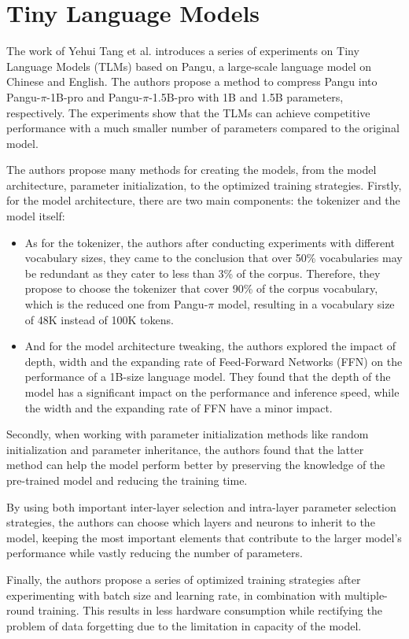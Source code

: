 \section{Tiny Language Models}
The work of Yehui Tang et al. \cite{tang2024rethinkingoptimizationarchitecturetiny} introduces a series of experiments on Tiny Language Models (TLMs) based on Pangu, a large-scale  language model on Chinese and English. The authors propose a method to compress Pangu into Pangu-$\pi$-1B-pro and Pangu-$\pi$-1.5B-pro with 1B and 1.5B parameters, respectively. The experiments show that the TLMs can achieve competitive performance with a much smaller number of parameters compared to the original model. \par
The authors propose many methods for creating the models, from the model architecture, parameter initialization, to the optimized training strategies. Firstly, for the model architecture, there are two main components: the tokenizer and the model itself:
\begin{itemize}
    \item As for the tokenizer, the authors after conducting experiments with different vocabulary sizes, they came to the conclusion that over 50\% vocabularies may be redundant as they cater to less than 3\% of the corpus. Therefore, they propose to choose the tokenizer that cover 90\% of the corpus vocabulary, which is the reduced one from Pangu-$\pi$ model, resulting in a vocabulary size of 48K instead of 100K tokens. 
    \item And for the model architecture tweaking, the authors explored the impact of depth, width and the expanding rate of Feed-Forward Networks (FFN) on the performance of a 1B-size language model. They found that the depth of the model has a significant impact on the performance and inference speed, while the width and the expanding rate of FFN have a minor impact.

\end{itemize}
Secondly, when working with parameter initialization methods like random initialization and parameter inheritance, the authors found that the latter method can help the model perform better by preserving the knowledge of the pre-trained model and reducing the training time. \par
By using both important inter-layer selection and intra-layer parameter selection strategies, the authors can choose which layers and neurons to inherit to the model, keeping the most important elements that contribute to the larger model's performance while vastly reducing the number of parameters. \par
Finally, the authors propose a series of optimized training strategies after experimenting with batch size and learning rate, in combination with multiple-round training. This results in less hardware consumption while rectifying the problem of data forgetting due to the limitation in capacity of the model. \par
